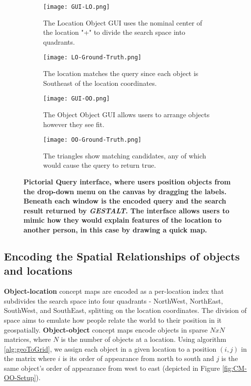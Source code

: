 \begin{figure*}[h]
    \centering
    \begin{subfigure}[t]{.2\textwidth} 
        \texttt{[image: GUI-LO.png]}
        \caption{\small The Location Object GUI uses the nominal center of the location "+" to divide the search space into quadrants.}
        \label{fig:GUI-LO}
    \end{subfigure}
    \hfill
    \begin{subfigure}[t]{.2\textwidth} 
        \texttt{[image: LO-Ground-Truth.png]}
        \caption{\small The location matches the query since each object is Southeast of the location coordinates.} %
        \label{fig:LO-Ground-Truth}
    \end{subfigure}
    \hfill
    \begin{subfigure}[t]{.2\textwidth}
        \texttt{[image: GUI-OO.png]}
        \caption{\small The Object Object GUI allows users to arrange objects however they see fit.}
        \label{fig:GUI-OO}
    \end{subfigure}
    \hfill
    \begin{subfigure}[t]{.2\textwidth} 
        \texttt{[image: OO-Ground-Truth.png]}
        \caption{\small The triangles show matching candidates, any of which would cause the query to return true.}
        \label{fig:OO-Ground-Truth}
    \end{subfigure}
    \hfill
    \caption{\textbf{Pictorial Query interface, where users position objects from the drop-down menu on the canvas by dragging the labels. Beneath each window is the encoded query and the search result returned by \emph{GESTALT}. The interface allows users to mimic how they would explain features of the location to another person, in this case by drawing a quick map.}}\label{figure:GUI} 
\end{figure*}

\subsection{Encoding the Spatial Relationships of objects and locations}

\textbf{Object-location} concept maps are encoded as a per-location index that subdivides the search space into four quadrants - NorthWest, NorthEast, SouthWest, and SouthEast, splitting on the location coordinates. The division of space aims to emulate how people relate the world to their position in it geospatially. 
\textbf{Object-object} concept maps encode objects in sparse $NxN$ matrices, where $N$ is the number of objects at a location. 
Using algorithm \ref{alg:geoToGrid}, we assign each object in a given location to a position $(i,j)$ in the matrix where $i$ is its order of appearance from north to south and $j$ is the same object's order of appearance from west to east (depicted in Figure \ref{fig:CM-OO-Setup}). 

